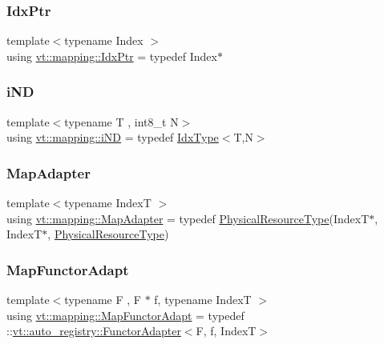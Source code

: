 \subsubsection{\texorpdfstring{Idx\+Ptr}{IdxPtr}}
{\footnotesize\ttfamily template$<$typename Index $>$ \\
using \hyperlink{namespacevt_1_1mapping_a1bcab0d331bff853fe09c964d5e9cc8c}{vt\+::mapping\+::\+Idx\+Ptr} = typedef Index$\ast$}

\mbox{\label{namespacevt_1_1mapping_ad53b53dc14e67437c17cefe9c3c70380}} 
\subsubsection{\texorpdfstring{i\+ND}{iND}}
{\footnotesize\ttfamily template$<$typename T , int8\+\_\+t N$>$ \\
using \hyperlink{namespacevt_1_1mapping_ad53b53dc14e67437c17cefe9c3c70380}{vt\+::mapping\+::i\+ND} = typedef \hyperlink{namespacevt_a906c25b521ff516f5e8ba6d96fe2d424}{Idx\+Type}$<$T,N$>$}

\mbox{\label{namespacevt_1_1mapping_a41b113c28bb6430fbcb5be66e08ccf9f}} 
\subsubsection{\texorpdfstring{Map\+Adapter}{MapAdapter}}
{\footnotesize\ttfamily template$<$typename IndexT $>$ \\
using \hyperlink{namespacevt_1_1mapping_a41b113c28bb6430fbcb5be66e08ccf9f}{vt\+::mapping\+::\+Map\+Adapter} = typedef \hyperlink{namespacevt_a2dc36fcada816dc6d11774d650328ee9}{Physical\+Resource\+Type}(IndexT$\ast$, IndexT$\ast$, \hyperlink{namespacevt_a2dc36fcada816dc6d11774d650328ee9}{Physical\+Resource\+Type})}

\mbox{\label{namespacevt_1_1mapping_add4b5257a62b56d194f7e931b608f8f0}} 
\subsubsection{\texorpdfstring{Map\+Functor\+Adapt}{MapFunctorAdapt}}
{\footnotesize\ttfamily template$<$typename F , F $\ast$ f, typename IndexT $>$ \\
using \hyperlink{namespacevt_1_1mapping_add4b5257a62b56d194f7e931b608f8f0}{vt\+::mapping\+::\+Map\+Functor\+Adapt} = typedef \+::\hyperlink{structvt_1_1auto__registry_1_1_functor_adapter}{vt\+::auto\+\_\+registry\+::\+Functor\+Adapter}$<$F, f, IndexT$>$}

